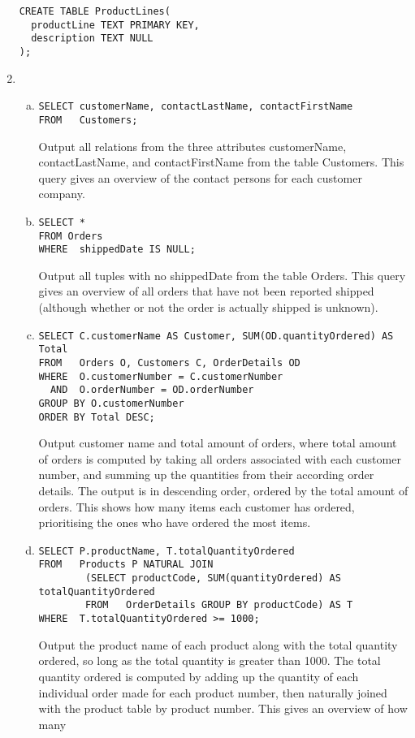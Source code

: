 \begin{enumerate}
\begin{verbatim}
CREATE TABLE ProductLines(
  productLine TEXT PRIMARY KEY,
  description TEXT NULL
);
  \end{verbatim}

  \newpage
  \item\quad\\
  \begin{enumerate}[a)]
    \item
    \begin{verbatim}
SELECT customerName, contactLastName, contactFirstName
FROM   Customers;
    \end{verbatim}

    Output all relations from the three attributes customerName, contactLastName, and contactFirstName from the table Customers.
    This query gives an overview of the contact persons for each customer company.

    \item
    \begin{verbatim}
SELECT *
FROM Orders
WHERE  shippedDate IS NULL;
    \end{verbatim}

    Output all tuples with no shippedDate from the table Orders.
    This query gives an overview of all orders that have not been reported shipped (although whether or not the order is actually shipped is unknown).

    \item
    \begin{verbatim}
SELECT C.customerName AS Customer, SUM(OD.quantityOrdered) AS Total
FROM   Orders O, Customers C, OrderDetails OD
WHERE  O.customerNumber = C.customerNumber
  AND  O.orderNumber = OD.orderNumber
GROUP BY O.customerNumber
ORDER BY Total DESC;
    \end{verbatim}

    Output customer name and total amount of orders, where total amount of orders is computed by
    taking all orders associated with each customer number, and summing up the quantities from their according order details.
    The output is in descending order, ordered by the total amount of orders.
    This shows how many items each customer has ordered, prioritising the ones who have ordered the most items.

    \item
    \begin{verbatim}
SELECT P.productName, T.totalQuantityOrdered
FROM   Products P NATURAL JOIN
        (SELECT productCode, SUM(quantityOrdered) AS totalQuantityOrdered
        FROM   OrderDetails GROUP BY productCode) AS T
WHERE  T.totalQuantityOrdered >= 1000;
    \end{verbatim}
    Output the product name of each product along with the total quantity ordered, so long as the total
    quantity is greater than 1000. The total quantity ordered is computed by adding up the quantity of each
    individual order made for each product number, then naturally joined with the product table by product number.
    This gives an overview of how many 


\end{enumerate}
\end{enumerate}
